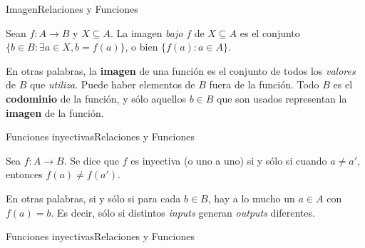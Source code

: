\documentclass[spanish]{beamer}
\begin{document}
\begin{frame}{Imagen}{Relaciones y Funciones}
    \begin{definition}
        Sean $f : A \to B$ y $X \subseteq A$. La \alert{imagen} \textit{bajo} $f$ de $X \subseteq A$ es el conjunto $\{b \in B : \exists a \in X, b = f(a)\}$, o bien $\{f(a) : a \in A\}$.
    \end{definition} \pause
    \bigskip
    En otras palabras, la \textbf{imagen} de una función es el conjunto de todos los \textit{valores} de $B$ que \textit{utiliza}.
    \bigskip
    Puede haber elementos de $B$ fuera de la función. Todo $B$ es el \textbf{codominio} de la función, y sólo aquellos $b \in B$ que son usados representan la \textbf{imagen} de la función.
    
\end{frame}

\begin{frame}{Funciones inyectivas}{Relaciones y Funciones}
    \begin{definition}
        Sea $f : A \to B$. Se dice que $f$ es \alert{inyectiva} (o \alert{uno a uno}) si y sólo si cuando $a \neq a'$, entonces $f(a) \neq f(a')$.
    \end{definition} \pause
    \bigskip
    En otras palabras, si y sólo si para cada $b \in B$, hay a lo mucho un $a \in A$ con $f(a) = b$. Es decir, sólo si distintos \textit{inputs} generan \textit{outputs} diferentes.
\end{frame}

\begin{frame}{Funciones inyectivas}{Relaciones y Funciones}
    \begin{center}
    \end{center}
\end{frame}
\end{document}

